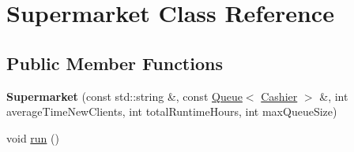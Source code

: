 \hypertarget{classSupermarket}{\section{Supermarket Class Reference}
\label{classSupermarket}
}
\subsection*{Public Member Functions}
\begin{DoxyCompactItemize}
\item 
\hypertarget{classSupermarket_a4d3d0ed8426d0f3d0be3424ba9f34ba7}{{\bfseries Supermarket} (const std\-::string \&, const \hyperlink{classQueue}{Queue}$<$ \hyperlink{classCashier}{Cashier} $>$ \&, int average\-Time\-New\-Clients, int total\-Runtime\-Hours, int max\-Queue\-Size)}\label{classSupermarket_a4d3d0ed8426d0f3d0be3424ba9f34ba7}

\item 
\hypertarget{classSupermarket_af2807840b2e04b8988f359d9e34960ea}{void \hyperlink{classSupermarket_af2807840b2e04b8988f359d9e34960ea}{run} ()}\label{classSupermarket_af2807840b2e04b8988f359d9e34960ea}


\end{DoxyCompactItemize}
